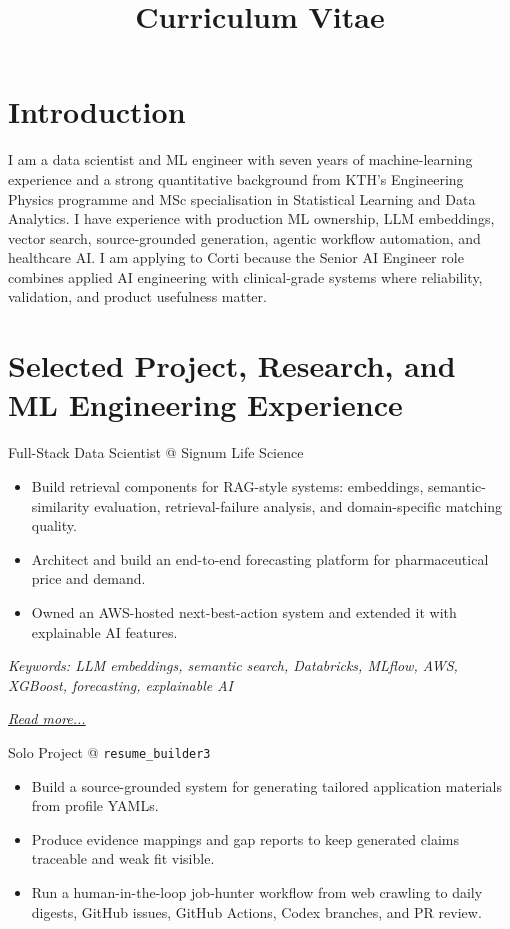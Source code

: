 \documentclass[11pt,a4paper]{moderncv}
\title{Curriculum Vitae}
\begin{document}
\makecvtitle

\section*{Introduction}
I am a data scientist and ML engineer with seven years of machine-learning experience and a strong quantitative background from KTH's Engineering Physics programme and MSc specialisation in Statistical Learning and Data Analytics. I have experience with production ML ownership, LLM embeddings, vector search, source-grounded generation, agentic workflow automation, and healthcare AI. I am applying to Corti because the Senior AI Engineer role combines applied AI engineering with clinical-grade systems where reliability, validation, and product usefulness matter.

\section{Selected Project, Research, and ML Engineering Experience}

\large{Full-Stack Data Scientist @ Signum Life Science}
\normalsize
\begin{itemize}
    \item Build retrieval components for RAG-style systems: embeddings, semantic-similarity evaluation, retrieval-failure analysis, and domain-specific matching quality.
    \item Architect and build an end-to-end forecasting platform for pharmaceutical price and demand.
    \item Owned an AWS-hosted next-best-action system and extended it with explainable AI features.
\end{itemize}

{\footnotesize\textit{Keywords: LLM embeddings, semantic search, Databricks, MLflow, AWS, XGBoost, forecasting, explainable AI}}

\hfill{\small{\textit{\hyperref[sec:signum]{Read more...}}}}

\large{Solo Project @ \texttt{resume\_builder3}}
\normalsize
\begin{itemize}
    \item Build a source-grounded system for generating tailored application materials from profile YAMLs.
    \item Produce evidence mappings and gap reports to keep generated claims traceable and weak fit visible.
    \item Run a human-in-the-loop job-hunter workflow from web crawling to daily digests, GitHub issues, GitHub Actions, Codex branches, and PR review.
\end{itemize}
\end{document}
